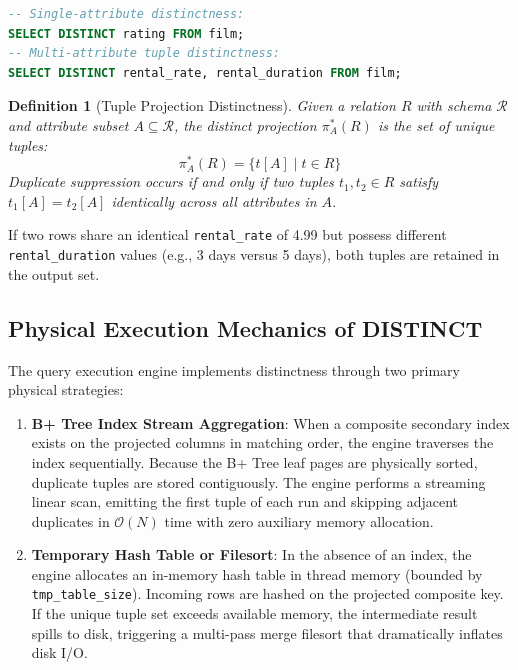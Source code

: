 \documentclass[10pt,twocolumn,letterpaper]{article}
\newtheorem{definition}[theorem]{Definition}
\begin{document}
\begin{lstlisting}[language=SQL]
-- Single-attribute distinctness:
SELECT DISTINCT rating FROM film;
-- Multi-attribute tuple distinctness:
SELECT DISTINCT rental_rate, rental_duration FROM film;
\end{lstlisting}

\begin{definition}[Tuple Projection Distinctness]
Given a relation $R$ with schema $\mathcal{R}$ and attribute subset $A \subseteq \mathcal{R}$, the distinct projection $\pi^*_{A}(R)$ is the set of unique tuples:
\begin{equation}
\pi^*_{A}(R) = \{ t[A] \mid t \in R \}
\end{equation}
Duplicate suppression occurs if and only if two tuples $t_1, t_2 \in R$ satisfy $t_1[A] = t_2[A]$ identically across all attributes in $A$.
\end{definition}

If two rows share an identical \texttt{rental\_rate} of 4.99 but possess different \texttt{rental\_duration} values (e.g., 3 days versus 5 days), both tuples are retained in the output set.

\subsection{Physical Execution Mechanics of DISTINCT}
The query execution engine implements distinctness through two primary physical strategies:
\begin{enumerate}
    \item \textbf{B+ Tree Index Stream Aggregation}: When a composite secondary index exists on the projected columns in matching order, the engine traverses the index sequentially. Because the B+ Tree leaf pages are physically sorted, duplicate tuples are stored contiguously. The engine performs a streaming linear scan, emitting the first tuple of each run and skipping adjacent duplicates in $\mathcal{O}(N)$ time with zero auxiliary memory allocation.
    \item \textbf{Temporary Hash Table or Filesort}: In the absence of an index, the engine allocates an in-memory hash table in thread memory (bounded by \texttt{tmp\_table\_size}). Incoming rows are hashed on the projected composite key. If the unique tuple set exceeds available memory, the intermediate result spills to disk, triggering a multi-pass merge filesort that dramatically inflates disk I/O.
\end{enumerate}
\end{document}
